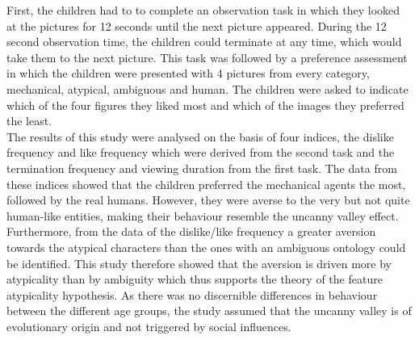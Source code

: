 First, the children had to to complete an observation task in which they looked at the pictures for 12 seconds until the next picture appeared. During the 12 second observation time, the children could terminate at any time, which would take them to the next picture. This task was followed by a preference assessment in which the children were presented with 4 pictures from every category, mechanical, atypical, ambiguous  and human. The children were asked to indicate which of the four figures they liked most and which of the images they preferred the least.\\
The results of this study were analysed on the basis of four indices, the dislike frequency and like frequency which were derived from the second task and the termination frequency and viewing duration from the first task.
The data from these indices showed that the children preferred the mechanical agents the most, followed by the real humans. 
However, they were averse to the very but not quite human-like entities, making their behaviour resemble the uncanny valley effect. Furthermore, from the data of the dislike/like frequency a greater aversion towards the atypical characters than the ones with an ambiguous ontology could be identified. This study therefore showed that the aversion is driven more by atypicality than by ambiguity which thus supports the theory of the feature atypicality hypothesis. As there was no discernible differences in behaviour between the different age groups, the study assumed that the uncanny valley is of evolutionary origin and not triggered by social influences.\\

